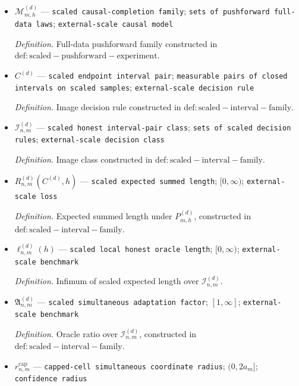 \documentclass{article}
\begin{document}
\begin{itemize}
  \par\smallskip\noindent\emph{Definition.} Observed pushforward law constructed in \(\mathrm{def:scaled-pushforward-experiment}\).
  \item \(\mathcal M^{(d)}_{m,h}\) --- \texttt{scaled causal-\allowbreak{}completion family}; \texttt{sets of pushforward full-\allowbreak{}data laws}; \texttt{external-\allowbreak{}scale causal model}
  \par\smallskip\noindent\emph{Definition.} Full-data pushforward family constructed in \(\mathrm{def:scaled-pushforward-experiment}\).
  \item \(C^{(d)}\) --- \texttt{scaled endpoint interval pair}; \texttt{measurable pairs of closed intervals on scaled samples}; \texttt{external-\allowbreak{}scale decision rule}
  \par\smallskip\noindent\emph{Definition.} Image decision rule constructed in \(\mathrm{def:scaled-interval-family}\).
  \item \(\mathcal I^{(d)}_{n,m}\) --- \texttt{scaled honest interval-\allowbreak{}pair class}; \texttt{sets of scaled decision rules}; \texttt{external-\allowbreak{}scale decision class}
  \par\smallskip\noindent\emph{Definition.} Image class constructed in \(\mathrm{def:scaled-interval-family}\).
  \item \(R^{(d)}_{n,m}(C^{(d)},h)\) --- \texttt{scaled expected summed length}; \([0,\infty)\); \texttt{external-\allowbreak{}scale loss}
  \par\smallskip\noindent\emph{Definition.} Expected summed length under \(P^{(d)}_{m,h}\), constructed in \(\mathrm{def:scaled-interval-family}\).
  \item \(\ell^{(d)}_{n,m}(h)\) --- \texttt{scaled local honest oracle length}; \([0,\infty)\); \texttt{external-\allowbreak{}scale benchmark}
  \par\smallskip\noindent\emph{Definition.} Infimum of scaled expected length over \(\mathcal I^{(d)}_{n,m}\).
  \item \(\mathfrak A^{(d)}_{n,m}\) --- \texttt{scaled simultaneous adaptation factor}; \([1,\infty]\); \texttt{external-\allowbreak{}scale benchmark}
  \par\smallskip\noindent\emph{Definition.} Oracle ratio over \(\mathcal I^{(d)}_{n,m}\), constructed in \(\mathrm{def:scaled-interval-family}\).
  \item \(r^{\mathrm{cap}}_{n,m}\) --- \texttt{capped-\allowbreak{}cell simultaneous coordinate radius}; \((0,2a_m]\); \texttt{confidence radius}

\end{itemize}
\end{document}

